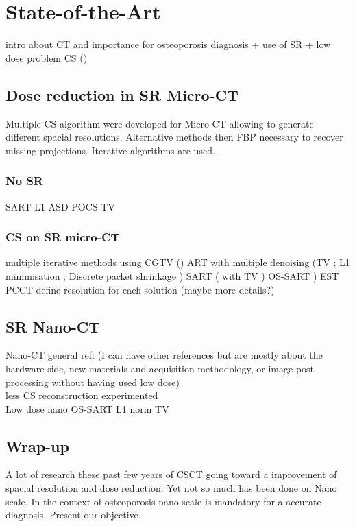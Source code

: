 \chapter{State-of-the-Art}
	intro about CT and importance for osteoporosis diagnosis + use of SR + low dose problem CS (\cite{[24], [25], [26]})

\section{Dose reduction in SR Micro-CT}
Multiple CS algorithm were developed for Micro-CT allowing to generate different spacial resolutions. Alternative methods then FBP necessary to recover missing projections. Iterative algorithms are used.
	\subsection{No SR}
		SART-L1 \cite{[11],[13]} ASD-POCS TV \cite{[9]}
	\subsection{CS on SR micro-CT}
		multiple iterative methods using CGTV (\cite{[12]}) ART with multiple denoising (TV \cite{[3]}; L1 minimisation \cite{[18]}; Discrete packet shrinkage \cite{[2]}) SART (\cite{[1]} with TV \cite{[5]}) OS-SART \cite{[6]}) EST \cite{[15], [16]}  PCCT \cite{[8]}
		 define resolution for each solution (maybe more details?)

\section{SR Nano-CT}
	Nano-CT general ref: \cite{[23]} (I can have other references but are mostly about the hardware side, new materials and acquisition methodology, or image post-processing without having used low dose)\\
	less CS reconstruction experimented	\\
	Low dose nano OS-SART L1 norm TV \cite{[10]}

\section{Wrap-up}
	A lot of research these past few years of CSCT going toward a improvement of spacial resolution and dose reduction. Yet not so much has been done on Nano scale. In the context of osteoporosis nano scale is mandatory for a accurate diagnosis. Present our objective.

